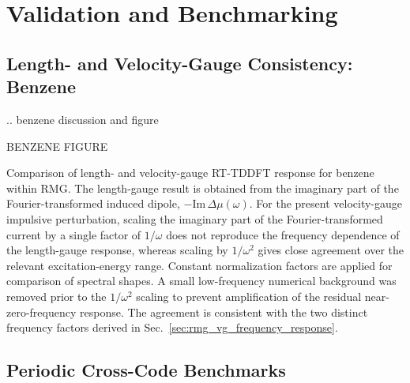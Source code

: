 
\section{Validation and Benchmarking} 
\label{sec:results}




\subsection{Length- and Velocity-Gauge Consistency: Benzene}

.. benzene discussion and figure

BENZENE FIGURE

Comparison of length- and velocity-gauge RT-TDDFT response for benzene
within RMG.  The length-gauge result is obtained from the imaginary part
of the Fourier-transformed induced dipole,
$-\mathrm{Im}\,\Delta\mu(\omega)$.  For the present velocity-gauge
impulsive perturbation, scaling the imaginary part of the
Fourier-transformed current by a single factor of $1/\omega$ does not
reproduce the frequency dependence of the length-gauge response,
whereas scaling by $1/\omega^{2}$ gives close agreement over the
relevant excitation-energy range.  Constant normalization factors are
applied for comparison of spectral shapes.  A small low-frequency
numerical background was removed prior to the $1/\omega^{2}$ scaling
to prevent amplification of the residual near-zero-frequency response.
The agreement is consistent with the two distinct frequency factors
derived in Sec.~\ref{sec:rmg_vg_frequency_response}.
\subsection{Periodic Cross-Code Benchmarks}

